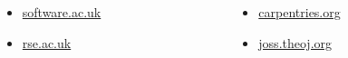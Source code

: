 \documentclass{beamer}
\begin{document}
\begin{frame}
   \begin{columns}
        \begin{column}{.5\textwidth}
            \begin{itemize}
                \item
                    \href{https://www.software.ac.uk/}{software.ac.uk}
                \item
                    \href{http://rse.ac.uk/}{rse.ac.uk}
            \end{itemize}
        \end{column}
        \begin{column}{.5\textwidth}
            \begin{itemize}
            \item
                \href{https://carpentries.org/}{carpentries.org}
            \item
                \href{http://joss.theoj.org/}{joss.theoj.org}
            \end{itemize}
        \end{column}
    \end{columns}
\end{frame}
\end{document}
